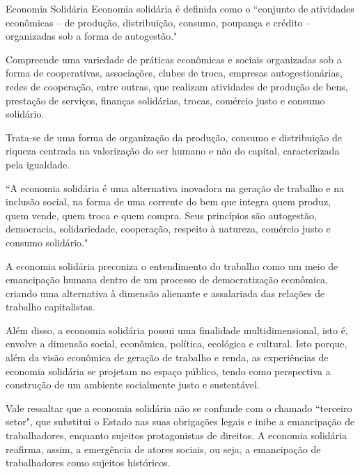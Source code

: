 \documentclass{if-beamer}
\begin{document}
	\begin{frame}[allowframebreaks]{Economia Solidária}
		Economia solidária é definida como o ``conjunto de atividades econômicas -- de produção, distribuição, consumo, poupança e crédito -- organizadas sob a forma de autogestão."
	
	\framebreak
	
	Compreende uma variedade de práticas econômicas e sociais organizadas sob a forma de cooperativas, associações, clubes de troca, empresas autogestionárias, redes de cooperação, entre outras, que realizam atividades de produção de bens, prestação de serviços, finanças solidárias, trocas, comércio justo e consumo 		solidário.
	 
	\framebreak
	 Trata-se de uma forma de organização da produção, consumo e distribuição de riqueza centrada na valorização do ser humano e não do capital, caracterizada pela igualdade.

	\framebreak
	
	``A economia solidária é uma alternativa inovadora na geração de trabalho e na inclusão social, na forma de uma corrente do bem que integra quem produz, quem vende, quem troca e quem compra. Seus princípios são autogestão, democracia, solidariedade, cooperação, respeito à natureza, comércio justo e consumo 				solidário."
	
	\framebreak
	
	A economia solidária preconiza o entendimento do trabalho como um meio de emancipação humana dentro de um processo de democratização econômica, criando uma alternativa à dimensão alienante e assalariada das relações de trabalho capitalistas.
	
	\framebreak
	
	Além disso, a economia solidária possui uma finalidade multidimensional, isto é, envolve a dimensão social, econômica, política, ecológica e cultural. Isto porque, além da visão econômica de geração de trabalho e renda, as experiências de economia solidária se projetam no espaço público, tendo como perspectiva a 	construção de um ambiente socialmente justo e sustentável. 
	
	\framebreak
	
	Vale ressaltar que a economia solidária não se confunde com o chamado ``terceiro setor", que substitui o Estado nas suas obrigações legais e inibe a emancipação de trabalhadores, enquanto sujeitos protagonistas de direitos. A economia solidária reafirma, assim, a emergência de atores sociais, ou seja, a 		emancipação de trabalhadores como sujeitos históricos.

	\end{frame}
	
\end{document}
